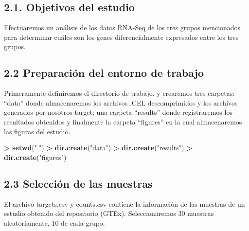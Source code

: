 \documentclass[
]{article}
\newenvironment{Shaded}{\begin{snugshade}}{\end{snugshade}}
\newcommand{\KeywordTok}[1]{\textcolor[rgb]{0.13,0.29,0.53}{\textbf{#1}}}
\newcommand{\NormalTok}[1]{#1}
\newcommand{\OperatorTok}[1]{\textcolor[rgb]{0.81,0.36,0.00}{\textbf{#1}}}
\newcommand{\StringTok}[1]{\textcolor[rgb]{0.31,0.60,0.02}{#1}}
\begin{document}
\hypertarget{objetivos-del-estudio}{%
\subsection{2.1. Objetivos del estudio}\label{objetivos-del-estudio}}

Efectuaremos un análisis de los datos RNA-Seq de los tres grupos
mencionados para determinar cuáles son los genes diferencialmente
expresados entre los tres grupos.

\hypertarget{preparaciuxf3n-del-entorno-de-trabajo}{%
\subsection{2.2 Preparación del entorno de
trabajo}\label{preparaciuxf3n-del-entorno-de-trabajo}}

Primeramente definiremos el directorio de trabajo, y crearemos tres
carpetas: ``data'' donde almacenaremos los archivos .CEL descomprimidos
y los archivos generados por nosotros target; una carpeta ``results''
donde registraremos los resultados obtenidos y finalmente la carpeta
``figures'' en la cual almacenaremos las figuras del estudio.

\begin{Shaded}
\begin{Highlighting}[]
\OperatorTok{>}\StringTok{ }\KeywordTok{setwd}\NormalTok{(}\StringTok{"."}\NormalTok{)}
\OperatorTok{>}\StringTok{ }\KeywordTok{dir.create}\NormalTok{(}\StringTok{"data"}\NormalTok{)}
\OperatorTok{>}\StringTok{ }\KeywordTok{dir.create}\NormalTok{(}\StringTok{"results"}\NormalTok{)}
\OperatorTok{>}\StringTok{ }\KeywordTok{dir.create}\NormalTok{(}\StringTok{"figures"}\NormalTok{)}
\end{Highlighting}
\end{Shaded}

\hypertarget{selecciuxf3n-de-las-muestras}{%
\subsection{2.3 Selección de las
muestras}\label{selecciuxf3n-de-las-muestras}}

El archivo targets.csv y counts.csv contiene la información de las
muestras de un estudio obtenido del repositorio (GTEx). Seleccionaremos
30 muestras aleatoriamente, 10 de cada grupo.
\end{document}
